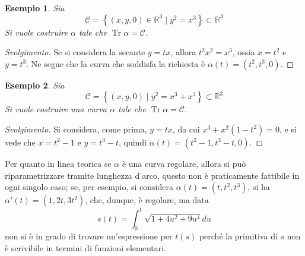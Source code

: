 \documentclass[12pt]{scrartcl}
\theoremstyle{style}
\newtheorem{esempio}{Esempio}[section]
\newenvironment{svolgimento}{\renewcommand\qedsymbol{$\blacksquare$}\begin{proof}[Svolgimento]}{\end{proof}}
\numberwithin{equation}{subsection}
\begin{document}
\begin{esempio}
Sia 
\[
\mathcal{C}  = \left\{ (x,y,0) \in \mathbb{R}^3  \mid y^2 = x^3 \right\}  \subset \mathbb{R}^3
\] 
Si vuole costruire $\alpha $ tale che $\operatorname{Tr}\alpha  = \mathcal{C} $.
\end{esempio}
\begin{svolgimento}
	Se si considera la secante $y = tx$, allora $t^2 x^2 = x^3$, ossia $x= t^2$ e $y = t^3$.
	Ne segue che la curva che soddisfa la richiesta \`e $\alpha (t) = (t^2 , t^3,0)$.
\end{svolgimento}
\begin{esempio}
Sia 
\[
\mathcal{C}  = \left\{ (x,y,0)  \mid y^2 = x^3 + x^2 \right\} \subset \mathbb{R}^3
\] 
Si vuole costruire una curva $\alpha $ tale che $\operatorname{Tr} \alpha  = \mathcal{C} $.
\end{esempio}
\begin{svolgimento}
	Si considera, come prima, $y=tx $, da cui $x^3 + x^2(1-t^2) = 0$, e si vede che $x = t^2 - 1$ e $y=t^3 -t$, quindi $\alpha (t) = (t^2 - 1, t^3-t,0)$.
\end{svolgimento}
\noindent Per quanto in linea teorica se $\alpha $ \`e una curva regolare, allora si pu\`o riparametrizzare tramite lunghezza d'arco, questo non \`e praticamente fattibile in ogni singolo caso; se, per esempio, si considera $\alpha (t) = (t,t^2,t^3)$, si ha $\alpha '(t) = (1,2t,3t^2)$, che, dunque, \`e regolare, ma data
\[
s(t) = \int_{0} ^t \sqrt{1 + 4u^2 + 9u^4} du
\] 
non si \`e in grado di trovare un'espressione per $t(s)$ perch\'e la primitiva di $s$ non \`e scrivibile in termini di funzioni elementari.
\end{document}
